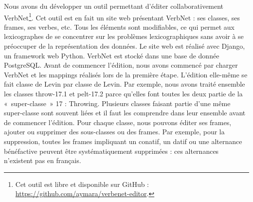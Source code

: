 Nous avons du développer un outil permettant d'éditer collaborativement
VerbNet\footnote{Cet outil est libre et disponible sur GitHub :
\url{https://github.com/aymara/verbenet-editor}.}. Cet outil est en fait un
site web présentant VerbNet : ses classes, ses frames, ses verbes, etc.  Tous
les éléments sont modifiables, ce qui permet aux lexicographes de se concentrer
sur les problèmes lexicographiques sans avoir à se préoccuper de la
représentation des données. Le site web est réalisé avec Django, un framework
web Python. VerbNet est stocké dans une base de donnée PostgreSQL. Avant de
commencer l'édition, nous avons commencé par charger VerbNet et les mappings
réalisés lors de la première étape. L'édition elle-même se fait classe de Levin
par classe de Levin. Par exemple, nous avons traité ensemble les classes
{\color{blue}throw-17.1} et {\color{blue}pelt-17.2} parce qu'elles font toutes
les deux partie de la «~super-classe~» 17 : Throwing. Plusieurs classes faisant
partie d'une même super-classe sont souvent liées et il faut les comprendre
dans leur ensemble avant de commencer l'édition. Pour chaque classe, nous
pouvons éditer ses frames, ajouter ou supprimer des sous-classes ou des frames.
Par exemple, pour la suppression, toutes les frames impliquant un conatif, un
datif ou une alternance bénéfactive peuvent être systématiquement supprimées :
ces alternances n'existent pas en français.

